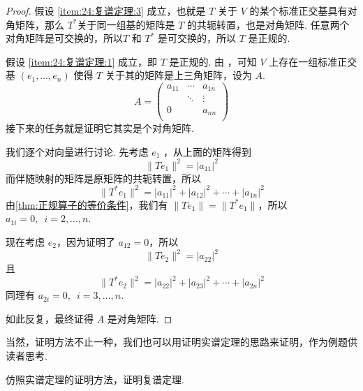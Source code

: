 \begin{proof}
    假设 \ref*{item:24:复谱定理:3} 成立，也就是 $ T $ 关于 $ V $ 的某个标准正交基具有对角矩阵，那么 $ T^* $关于同一组基的矩阵是 $ T $ 的共轭转置，也是对角矩阵. 任意两个对角矩阵是可交换的，所以$ T $ 和 $ T^* $ 是可交换的，所以 $ T $ 是正规的.

    假设 \ref*{item:24:复谱定理:1} 成立，即 $ T $ 是正规的. 由 ，可知 $ V $ 上存在一组标准正交基 $ (e_1, \ldots , e_n) $ 使得 $ T $ 关于其的矩阵是上三角矩阵，设为 $ A $.
    \[ A = \begin{pmatrix}
            a_{11} & \cdots & a_{1n} \\
                   & \ddots & \vdots \\
            0      &        & a_{nn} \\
        \end{pmatrix} \]
    接下来的任务就是证明它其实是个对角矩阵.

    我们逐个对向量进行讨论. 先考虑 $ e_1 $ ，从上面的矩阵得到
    \[ \lVert Te_1 \rVert^2 = \lvert a_{11} \rvert^2 \]
    而伴随映射的矩阵是原矩阵的共轭转置，所以
    \[ \lVert T^*e_1 \rVert^2 = \lvert a_{11} \rvert^2 + \lvert a_{12} \rvert^2 + \cdots + \lvert a_{1n} \rvert^2 \]
    由\autoref{thm:正规算子的等价条件}，我们有 $ \lVert Te_1 \rVert = \lVert T^*e_1 \rVert $，所以 $ a_{1i} = 0,\enspace i = 2, \ldots , n $.

    现在考虑 $ e_2 $，因为证明了 $ a_{12} = 0 $，所以
    \[ \lVert Te_2 \rVert^2 = \lvert a_{22} \rvert^2 \]
    且
    \[ \lVert T^*e_2 \rVert^2 = \lvert a_{22} \rvert^2 + \lvert a_{23} \rvert^2 + \cdots + \lvert a_{2n} \rvert^2 \]
    同理有 $ a_{2i} = 0,\enspace i = 3, \ldots , n $.

    如此反复，最终证得 $ A $ 是对角矩阵.
\end{proof}

当然，证明方法不止一种，我们也可以用证明实谱定理的思路来证明，作为例题供读者思考.


\begin{example}{}{}
    仿照实谱定理的证明方法，证明复谱定理.
\end{example}

